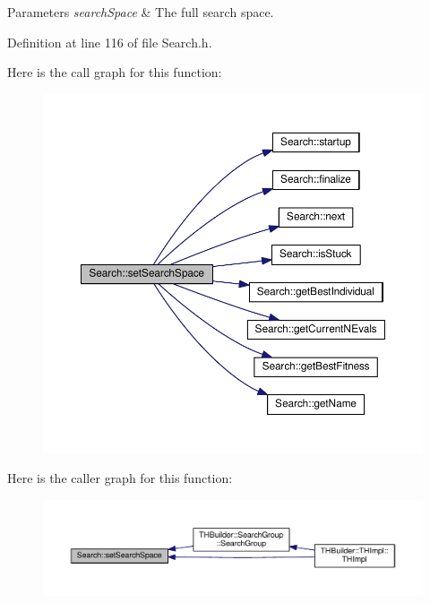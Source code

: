 \begin{DoxyParams}{Parameters}
{\em search\+Space} & The full search space. \\
\hline
\end{DoxyParams}


Definition at line 116 of file Search.\+h.



Here is the call graph for this function\+:\nopagebreak
\begin{figure}[H]
\begin{center}
\leavevmode
\includegraphics[width=350pt]{classSearch_af9f46406f1f1f7f89ab294c155738ca6_cgraph}
\end{center}
\end{figure}




Here is the caller graph for this function\+:\nopagebreak
\begin{figure}[H]
\begin{center}
\leavevmode
\includegraphics[width=350pt]{classSearch_af9f46406f1f1f7f89ab294c155738ca6_icgraph}
\end{center}
\end{figure}


